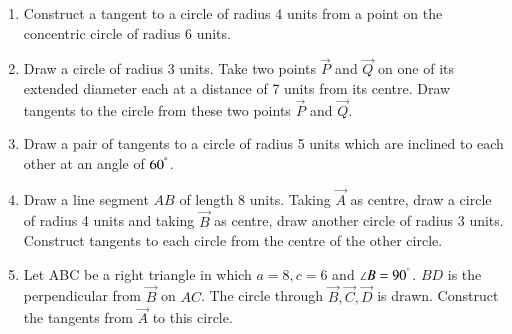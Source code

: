 \documentclass[journal,12pt,twocolumn]{IEEEtran}
\renewcommand\thesection{\arabic{section}}
\begin{document}
\begin{enumerate}[label=\thesection.\arabic*
,ref=\thesection.\theenumi]
%
%
%
%

\item Construct a tangent to a circle of radius 4 units from a point on the concentric circle of radius 6 
units.
\item Draw a circle of radius 3 units. Take  two points $\vec{P}$ and $\vec{Q}$ on one of its extended 
diameter each at a distance of 7 units from its centre. Draw tangents to the circle from these two points 
$\vec{P}$ and $\vec{Q}$.
\item Draw a pair of tangents to a circle of radius 5 units which are inclined to each other at an angle of 
$60^{\degree}$.
\item Draw a line segment $AB$ of length 8 units. Taking $\vec{A}$ as centre, draw a circle of radius 4 units 
and taking $\vec{B}$ as centre, draw another circle of radius 3 units. Construct tangents to each circle from 
the centre of the other circle.
\item Let ABC be a right triangle in which $a = 8, c = 6$ and $\angle B = 90^{\degree}$.  $BD$ is the 
perpendicular from $\vec{B}$ on $AC$. The circle through $\vec{B}, \vec{C}, \vec{D}$ is drawn.  Construct the 
tangents from $\vec{A}$ to this circle.
\end{enumerate}
\end{document}
